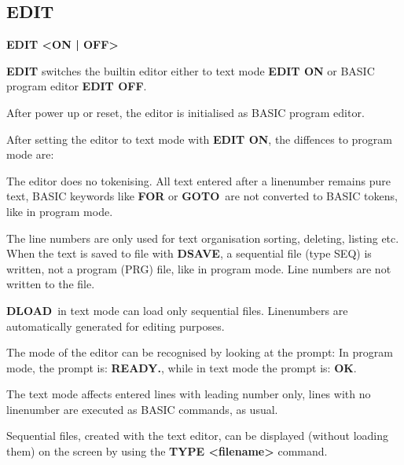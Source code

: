 \subsection{EDIT}
\begin{description}[leftmargin=2cm,style=nextline]
\item [Format:] {\bf EDIT <ON | OFF>}

\item [Usage:]  {\bf EDIT} switches the builtin editor
               either to text mode {\bf EDIT ON}
               or BASIC program editor {\bf EDIT OFF}.

               After power up or reset, the editor
               is initialised as BASIC program editor.

               After setting the editor to text mode with
               {\bf EDIT ON}, the diffences to program mode are:

               The editor does no tokenising.
               All text entered after a linenumber remains pure text,
               BASIC keywords like {\bf FOR} or {\bf GOTO} are not
               converted to BASIC tokens, like in program mode.

               The line numbers are only used for text organisation
               sorting, deleting, listing etc.
               When the text is saved to file with {\bf DSAVE},
               a sequential file (type SEQ) is written, not a
               program (PRG) file, like in program mode.
               Line numbers are not written to the file.

               {\bf DLOAD} in text mode can load only sequential files.
               Linenumbers are automatically generated for editing purposes.

               The mode of the editor can be recognised by looking at the prompt:
               In program mode, the prompt is: {\bf READY.}, while in text mode
               the prompt is: {\bf OK}.

               The text mode affects entered lines with leading number only,
               lines with no linenumber are executed as BASIC commands,
               as usual.

               Sequential files, created with the text editor, can be displayed
               (without loading them)
               on the screen by using the {\bf TYPE <filename>} command.

\newpage


\end{description}
